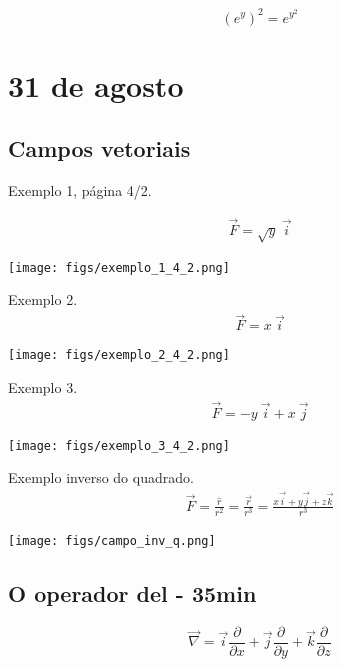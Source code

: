 \documentclass[a4paper,10pt]{book}
\begin{document}
 $$\left(e^y\right)^2=e^{y^2}$$
 
 \chapter{31 de agosto}
 \section{Campos vetoriais}
Exemplo 1, página 4/2.
 
 \begin{eqnarray*}
  \vec{F}=\sqrt{y}~\!\vec{i}
 \end{eqnarray*}

 
 \begin{center}
 \texttt{[image: figs/exemplo\_1\_4\_2.png]}
 \end{center}

 
 Exemplo 2.
 \begin{eqnarray*}
  \vec{F}=x~\!\vec{i}
 \end{eqnarray*}

 
 \begin{center}
 \texttt{[image: figs/exemplo\_2\_4\_2.png]}
 \end{center}


  Exemplo 3.
 \begin{eqnarray*}
  \vec{F}=-y~\!\vec{i}+x~\!\vec{j}
 \end{eqnarray*}

 
 \begin{center}
 \texttt{[image: figs/exemplo\_3\_4\_2.png]}
 \end{center}

 \newpage

   Exemplo inverso do quadrado.
 \begin{eqnarray*}
  \vec{F}=\frac{\hat{r}}{r^2} =\frac{\vec{r}}{r^3}=\frac{x\vec{i}+y\vec{j}+z\vec{k}}{r^3}
 \end{eqnarray*}

 
 \begin{center}
 \texttt{[image: figs/campo\_inv\_q.png]}
 \end{center}

 \section{O operador del - 35min}
 $$\vec{\nabla}=\vec{i}\frac{\partial}{\partial x}+\vec{j}\frac{\partial}{\partial y}+\vec{k}\frac{\partial}{\partial z}$$
 
\end{document}
